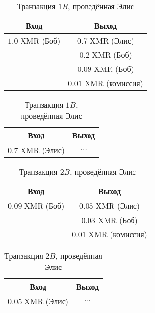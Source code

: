 \documentclass{mrl}
\begin{document}
\begin{table}[!htb]
    \caption{Транзакция $1$}
    \label{linkByAssociationSolnA}
    \begin{subtable}{.5\linewidth}
      \centering
        \caption{Транзакция $1A$, проведённая Бобом}
        \begin{tabular}{|c|c|}\hline
            Вход & Выход \\\hline
            $1.0$ XMR (Боб) & $0.7$ XMR (Элис)\\
             & $0.2$ XMR (Боб)\\
             & $0.09$ XMR (Боб)\\
             & $0.01$ XMR (комиссия)\\\hline
        \end{tabular}
    \end{subtable}%
    \begin{subtable}{.5\linewidth}
      \centering
        \caption{Транзакция $1B$, проведённая Элис}
        \begin{tabular}{|c|c|}\hline
            Вход & Выход\\\hline
            $0.7$ XMR (Элис) & $\cdots$\\ \hline
        \end{tabular}
    \end{subtable}
\end{table}
\begin{table}[!htb]
    \caption{Транзакция $2$}
    \label{linkByAssociationSolnB}
    \begin{subtable}{.5\linewidth}
      \centering
        \caption{Транзакция $2A$, проведённая Бобом}
        \begin{tabular}{|c|c|}\hline
            Вход & Выход \\\hline
            $0.09$ XMR (Боб) & $0.05$ XMR (Элис)\\
             & $0.03$ XMR (Боб)\\
             & $0.01$ XMR (комиссия)\\\hline
        \end{tabular}
    \end{subtable}%
    \begin{subtable}{.5\linewidth}
      \centering
        \caption{Транзакция $2B$, проведённая Элис}
        \begin{tabular}{|c|c|}\hline
            Вход & Выход\\\hline
            $0.05$ XMR (Элис) & $\cdots$\\ \hline
        \end{tabular}
    \end{subtable}
\end{table}
\end{document}
